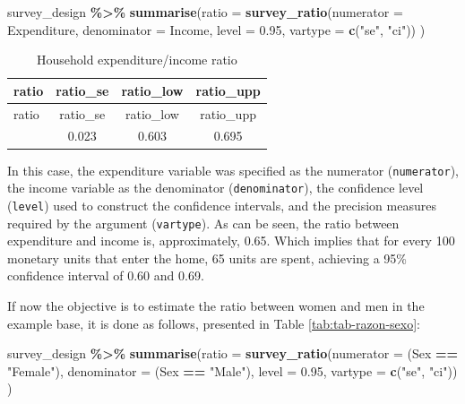 \documentclass[
  english,
  12pt,
]{book}
\newenvironment{Shaded}{\begin{snugshade}}{\end{snugshade}}
\newcommand{\AttributeTok}[1]{\textcolor[rgb]{0.13,0.29,0.53}{#1}}
\newcommand{\FloatTok}[1]{\textcolor[rgb]{0.00,0.00,0.81}{#1}}
\newcommand{\FunctionTok}[1]{\textcolor[rgb]{0.13,0.29,0.53}{\textbf{#1}}}
\newcommand{\NormalTok}[1]{#1}
\newcommand{\SpecialCharTok}[1]{\textcolor[rgb]{0.81,0.36,0.00}{\textbf{#1}}}
\newcommand{\StringTok}[1]{\textcolor[rgb]{0.31,0.60,0.02}{#1}}
\begin{document}
\begin{Shaded}
\begin{Highlighting}[]
\NormalTok{survey\_design }\SpecialCharTok{\%\textgreater{}\%}
  \FunctionTok{summarise}\NormalTok{(}\AttributeTok{ratio =} \FunctionTok{survey\_ratio}\NormalTok{(}\AttributeTok{numerator =}\NormalTok{ Expenditure,}
                                 \AttributeTok{denominator =}\NormalTok{ Income,}
                                 \AttributeTok{level =} \FloatTok{0.95}\NormalTok{,}
                                 \AttributeTok{vartype =} \FunctionTok{c}\NormalTok{(}\StringTok{"se"}\NormalTok{, }\StringTok{"ci"}\NormalTok{))}
\NormalTok{            )}
\end{Highlighting}
\end{Shaded}

\begin{longtable}[]{@{}lccc@{}}
\caption{\label{tab:tab-razon-gasto-ingreso}Household expenditure/income ratio}\tabularnewline
\toprule\noalign{}
ratio & ratio\_se & ratio\_low & ratio\_upp \\
\midrule\noalign{}
\endfirsthead
\toprule\noalign{}
ratio & ratio\_se & ratio\_low & ratio\_upp \\
\midrule\noalign{}
\endhead
\bottomrule\noalign{}
\endlastfoot
0.649 & 0.023 & 0.603 & 0.695 \\
\end{longtable}

In this case, the expenditure variable was specified as the numerator (\texttt{numerator}), the income variable as the denominator (\texttt{denominator}), the confidence level (\texttt{level}) used to construct the confidence intervals, and the precision measures required by the argument (\texttt{vartype}). As can be seen, the ratio between expenditure and income is, approximately, 0.65. Which implies that for every 100 monetary units that enter the home, 65 units are spent, achieving a 95\% confidence interval of 0.60 and 0.69.

If now the objective is to estimate the ratio between women and men in the example base, it is done as follows, presented in Table \ref{tab:tab-razon-sexo}:

\begin{Shaded}
\begin{Highlighting}[]
\NormalTok{survey\_design }\SpecialCharTok{\%\textgreater{}\%}
  \FunctionTok{summarise}\NormalTok{(}\AttributeTok{ratio =} \FunctionTok{survey\_ratio}\NormalTok{(}\AttributeTok{numerator =}\NormalTok{ (Sex }\SpecialCharTok{==} \StringTok{"Female"}\NormalTok{),}
                                 \AttributeTok{denominator =}\NormalTok{ (Sex }\SpecialCharTok{==} \StringTok{"Male"}\NormalTok{),}
                                 \AttributeTok{level =} \FloatTok{0.95}\NormalTok{,}
                                 \AttributeTok{vartype =} \FunctionTok{c}\NormalTok{(}\StringTok{"se"}\NormalTok{, }\StringTok{"ci"}\NormalTok{))}
\NormalTok{            )}
\end{Highlighting}
\end{Shaded}
\end{document}
